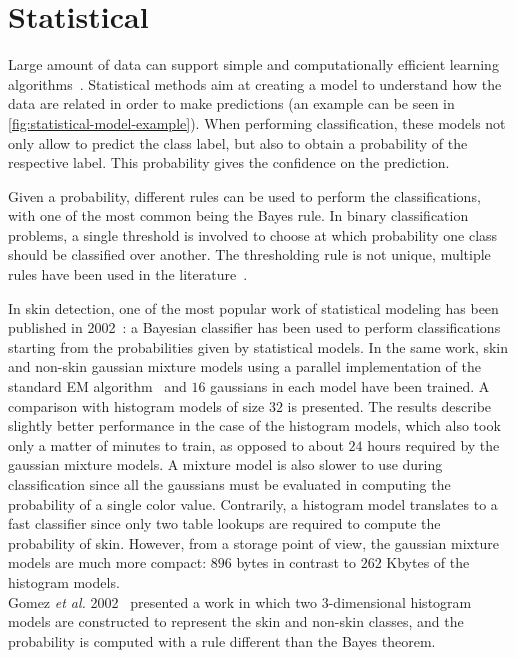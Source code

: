 \FloatBarrier
\section{Statistical}

Large amount of data can support simple and computationally efficient learning algorithms~\cite{jones2002statistical}.
Statistical methods aim at creating a model to understand how the data are related in order to make predictions (an example can be seen in \autoref{fig:statistical-model-example}).
When performing classification, these models not only allow to predict the class label, but also to obtain a probability of the respective label.
This probability gives the confidence on the prediction.

Given a probability, different rules can be used to perform the classifications, with one of the most common being the Bayes rule.
In binary classification problems, a single threshold is involved to choose at which probability one class should be classified over another.
The thresholding rule is not unique, multiple rules have been used in the literature~\cite{jones2002statistical, phung2001universal}.

In skin detection, one of the most popular work of statistical modeling has been published in 2002~\cite{jones2002statistical}: a Bayesian classifier has been used to perform classifications starting from the probabilities given by statistical models.
In the same work, skin and non-skin gaussian mixture models using a parallel implementation of the standard EM algorithm~\cite{redner1984mixture} and $16$ gaussians in each model have been trained.
A comparison with histogram models of size $32$ is presented.
The results describe slightly better performance in the case of the histogram models, which also took only a matter of minutes to train, as opposed to about $24$ hours required by the gaussian mixture models.
A mixture model is also slower to use during classification since all the gaussians must be evaluated in computing the probability of a single color value.
Contrarily, a histogram model translates to a fast classifier since only two table lookups are required to compute the probability of skin.
However, from a storage point of view, the gaussian mixture models are much more compact: $896$ bytes in contrast to $262$ Kbytes of the histogram models.\\
Gomez \textit{et al.} 2002~\cite{gomez2002selecting} presented a work in which two 3-dimensional histogram models are constructed to represent the skin and non-skin classes, and the probability is computed with a rule different than the Bayes theorem.

